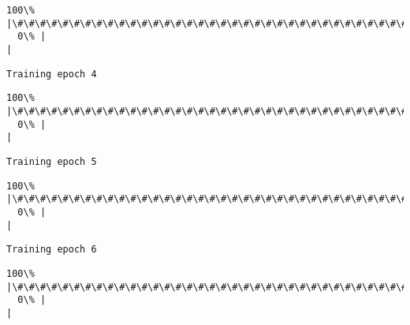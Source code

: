 \documentclass[11pt]{article}
\begin{document}
    \begin{Verbatim}[commandchars=\\\{\}]
100\% |\#\#\#\#\#\#\#\#\#\#\#\#\#\#\#\#\#\#\#\#\#\#\#\#\#\#\#\#\#\#\#\#\#\#\#\#\#\#\#\#\#\#\#\#\#\#\#\#\#\#\#\#\#\#\#\#\#\#\#\#\#\#\#\#\#\#\#\#\#\#\#\#|
  0\% |                                                                        |
    \end{Verbatim}

    \begin{Verbatim}[commandchars=\\\{\}]
Training epoch 4

    \end{Verbatim}

    \begin{Verbatim}[commandchars=\\\{\}]
100\% |\#\#\#\#\#\#\#\#\#\#\#\#\#\#\#\#\#\#\#\#\#\#\#\#\#\#\#\#\#\#\#\#\#\#\#\#\#\#\#\#\#\#\#\#\#\#\#\#\#\#\#\#\#\#\#\#\#\#\#\#\#\#\#\#\#\#\#\#\#\#\#\#|
  0\% |                                                                        |
    \end{Verbatim}

    \begin{Verbatim}[commandchars=\\\{\}]
Training epoch 5

    \end{Verbatim}

    \begin{Verbatim}[commandchars=\\\{\}]
100\% |\#\#\#\#\#\#\#\#\#\#\#\#\#\#\#\#\#\#\#\#\#\#\#\#\#\#\#\#\#\#\#\#\#\#\#\#\#\#\#\#\#\#\#\#\#\#\#\#\#\#\#\#\#\#\#\#\#\#\#\#\#\#\#\#\#\#\#\#\#\#\#\#|
  0\% |                                                                        |
    \end{Verbatim}

    \begin{Verbatim}[commandchars=\\\{\}]
Training epoch 6

    \end{Verbatim}

    \begin{Verbatim}[commandchars=\\\{\}]
100\% |\#\#\#\#\#\#\#\#\#\#\#\#\#\#\#\#\#\#\#\#\#\#\#\#\#\#\#\#\#\#\#\#\#\#\#\#\#\#\#\#\#\#\#\#\#\#\#\#\#\#\#\#\#\#\#\#\#\#\#\#\#\#\#\#\#\#\#\#\#\#\#\#|
  0\% |                                                                        |
    \end{Verbatim}
\end{document}
